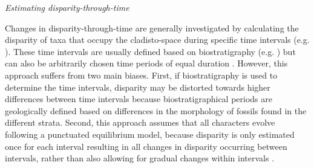 \documentclass[12pt,letterpaper]{article}
\renewcommand{\subsection}[1]{%
\bigskip
\begin{center}
\begin{large}
\normalfont\itshape #1
\end{large}
\end{center}}
\begin{document}
\subsection{Estimating disparity-through-time} 
Changes in disparity-through-time are generally investigated by calculating the disparity of taxa that occupy the cladisto-space during specific time intervals (e.g. \cite{Brusatte12092008,bensonfaunal2014}).
These time intervals are usually defined based on biostratigraphy (e.g. \cite{Brusatte12092008}) but can also be arbitrarily chosen time periods of equal duration \cite{bensonfaunal2014}.
However, this approach suffers from two main biases. 
First, if biostratigraphy is used to determine the time intervals, disparity may be distorted towards higher differences between time intervals because biostratigraphical periods are geologically defined based on differences in the morphology of fossils found in the different strata.
Second, this approach assumes that all characters evolve following a punctuated equilibrium model, because disparity is only estimated once for each interval resulting in all changes in disparity occurring between intervals, rather than also allowing for gradual changes within intervals \cite{Hunt21042015}.
\end{document}
